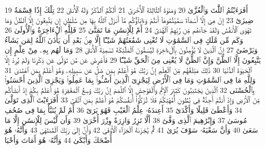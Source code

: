 {\tiny\colorbox{cl_aya}{19}} أَفَرَءَيْتُمُ ٱللَّٰتَ وَٱلْعُزَّىٰ
{\tiny\colorbox{cl_aya}{20}} وَمَنَوٰةَ ٱلثَّالِثَةَ ٱلْأُخْرَىٰٓ
{\tiny\colorbox{cl_aya}{21}} أَلَكُمُ ٱلذَّكَرُ وَلَهُ ٱلْأُنثَىٰ
{\tiny\colorbox{cl_aya}{22}} تِلْكَ إِذًا قِسْمَةٌ ضِيزَىٰٓ
{\tiny\colorbox{cl_aya}{23}} إِنْ هِىَ إِلَّآ أَسْمَآءٌ سَمَّيْتُمُوهَآ أَنتُمْ وَءَابَآؤُكُم مَّآ أَنزَلَ ٱللَّهُ بِهَا مِن سُلْطَٰنٍ إِن يَتَّبِعُونَ إِلَّا ٱلظَّنَّ وَمَا تَهْوَى ٱلْأَنفُسُ وَلَقَدْ جَآءَهُم مِّن رَّبِّهِمُ ٱلْهُدَىٰٓ
{\tiny\colorbox{cl_aya}{24}} أَمْ لِلْإِنسَٰنِ مَا تَمَنَّىٰ
{\tiny\colorbox{cl_aya}{25}} فَلِلَّهِ ٱلْءَاخِرَةُ وَٱلْأُولَىٰ
{\tiny\colorbox{cl_aya}{26}} وَكَم مِّن مَّلَكٍ فِى ٱلسَّمَٰوَٰتِ لَا تُغْنِى شَفَٰعَتُهُمْ شَيْـًٔا إِلَّا مِنۢ بَعْدِ أَن يَأْذَنَ ٱللَّهُ لِمَن يَشَآءُ وَيَرْضَىٰٓ
{\tiny\colorbox{cl_aya}{27}} إِنَّ ٱلَّذِينَ لَا يُؤْمِنُونَ بِٱلْءَاخِرَةِ لَيُسَمُّونَ ٱلْمَلَٰٓئِكَةَ تَسْمِيَةَ ٱلْأُنثَىٰ
{\tiny\colorbox{cl_aya}{28}} وَمَا لَهُم بِهِۦ مِنْ عِلْمٍ إِن يَتَّبِعُونَ إِلَّا ٱلظَّنَّ وَإِنَّ ٱلظَّنَّ لَا يُغْنِى مِنَ ٱلْحَقِّ شَيْـًٔا
{\tiny\colorbox{cl_aya}{29}} فَأَعْرِضْ عَن مَّن تَوَلَّىٰ عَن ذِكْرِنَا وَلَمْ يُرِدْ إِلَّا ٱلْحَيَوٰةَ ٱلدُّنْيَا
{\tiny\colorbox{cl_aya}{30}} ذَٰلِكَ مَبْلَغُهُم مِّنَ ٱلْعِلْمِ إِنَّ رَبَّكَ هُوَ أَعْلَمُ بِمَن ضَلَّ عَن سَبِيلِهِۦ وَهُوَ أَعْلَمُ بِمَنِ ٱهْتَدَىٰ
{\tiny\colorbox{cl_aya}{31}} وَلِلَّهِ مَا فِى ٱلسَّمَٰوَٰتِ وَمَا فِى ٱلْأَرْضِ لِيَجْزِىَ ٱلَّذِينَ أَسَٰٓـُٔوا۟ بِمَا عَمِلُوا۟ وَيَجْزِىَ ٱلَّذِينَ أَحْسَنُوا۟ بِٱلْحُسْنَى
{\tiny\colorbox{cl_aya}{32}} ٱلَّذِينَ يَجْتَنِبُونَ كَبَٰٓئِرَ ٱلْإِثْمِ وَٱلْفَوَٰحِشَ إِلَّا ٱللَّمَمَ إِنَّ رَبَّكَ وَٰسِعُ ٱلْمَغْفِرَةِ هُوَ أَعْلَمُ بِكُمْ إِذْ أَنشَأَكُم مِّنَ ٱلْأَرْضِ وَإِذْ أَنتُمْ أَجِنَّةٌ فِى بُطُونِ أُمَّهَٰتِكُمْ فَلَا تُزَكُّوٓا۟ أَنفُسَكُمْ هُوَ أَعْلَمُ بِمَنِ ٱتَّقَىٰٓ
{\tiny\colorbox{cl_aya}{33}} أَفَرَءَيْتَ ٱلَّذِى تَوَلَّىٰ
{\tiny\colorbox{cl_aya}{34}} وَأَعْطَىٰ قَلِيلًا وَأَكْدَىٰٓ
{\tiny\colorbox{cl_aya}{35}} أَعِندَهُۥ عِلْمُ ٱلْغَيْبِ فَهُوَ يَرَىٰٓ
{\tiny\colorbox{cl_aya}{36}} أَمْ لَمْ يُنَبَّأْ بِمَا فِى صُحُفِ مُوسَىٰ
{\tiny\colorbox{cl_aya}{37}} وَإِبْرَٰهِيمَ ٱلَّذِى وَفَّىٰٓ
{\tiny\colorbox{cl_aya}{38}} أَلَّا تَزِرُ وَازِرَةٌ وِزْرَ أُخْرَىٰ
{\tiny\colorbox{cl_aya}{39}} وَأَن لَّيْسَ لِلْإِنسَٰنِ إِلَّا مَا سَعَىٰ
{\tiny\colorbox{cl_aya}{40}} وَأَنَّ سَعْيَهُۥ سَوْفَ يُرَىٰ
{\tiny\colorbox{cl_aya}{41}} ثُمَّ يُجْزَىٰهُ ٱلْجَزَآءَ ٱلْأَوْفَىٰ
{\tiny\colorbox{cl_aya}{42}} وَأَنَّ إِلَىٰ رَبِّكَ ٱلْمُنتَهَىٰ
{\tiny\colorbox{cl_aya}{43}} وَأَنَّهُۥ هُوَ أَضْحَكَ وَأَبْكَىٰ
{\tiny\colorbox{cl_aya}{44}} وَأَنَّهُۥ هُوَ أَمَاتَ وَأَحْيَا
